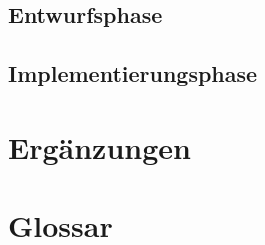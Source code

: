\documentclass[parskip=full]{scrartcl}
\begin{document}
\subsection{Entwurfsphase}

\subsection{Implementierungsphase}

\section{Ergänzungen}\label{erweiterung}

\section{Glossar}\label{glossar}

\renewcommand*{\glossarysection}[2][]{}	%
\printnoidxglossaries				%
\end{document}
